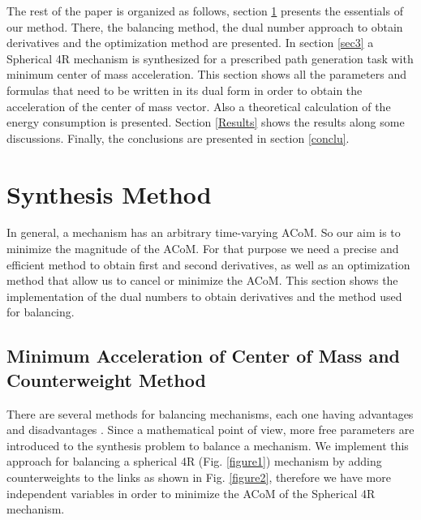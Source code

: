 \documentclass[11pt]{article}
\begin{document}
The rest of the paper is organized as follows, section \ref{sec2} 
presents the essentials of our method. There, the balancing method, the 
dual number approach to obtain derivatives and the optimization method 
are presented. In section \ref{sec3} a Spherical 4R mechanism is 
synthesized for a prescribed path generation task with minimum center of 
mass acceleration. This section shows all the parameters and formulas 
that need to be written in its dual form in order to obtain the 
acceleration of the center of mass vector. Also a theoretical calculation
of the energy consumption is presented. Section \ref{Results} shows 
the results along some discussions. Finally, the conclusions are 
presented in section \ref{conclu}. 

\section{Synthesis Method}\label{sec2}
In general, a mechanism has an arbitrary time-varying ACoM. So our aim 
is to minimize the magnitude of the ACoM. For that purpose we need a 
precise and efficient method to obtain first and second derivatives, as 
well as an optimization method that allow us to cancel or minimize the 
ACoM. This section shows the implementation of the dual numbers to 
obtain derivatives and the method used for balancing.

\subsection{Minimum Acceleration of Center of Mass and Counterweight 
Method }\label{subsec2.1}
There are several methods for balancing mechanisms, each one having 
advantages and disadvantages \cite{Lowen1983, Arakelian2005, Wijk2009}. 
Since a mathematical point of view, more free parameters are introduced 
to the synthesis problem to balance a mechanism. We implement this 
approach for balancing a spherical 4R (Fig. \ref{figure1}) mechanism by 
adding counterweights \cite{Bagci1982,Feng1990,Smith1999,Rosario2005} to 
the links as shown in Fig. \ref{figure2}, therefore we have more 
independent variables in order to minimize the ACoM of the Spherical 4R 
mechanism. 
\end{document}
